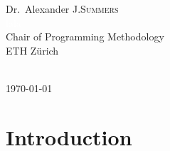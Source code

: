 \documentclass[titlepage,11pt,a4paper]{report}
\theoremstyle{plain}
\newcommand\blankpage{%
    \null
    \thispagestyle{empty}%
    \addtocounter{page}{-1}%
    \newpage}
\begin{document}
\begin{titlepage}
\begin{minipage}{0.4\textwidth}
\begin{flushright}
\large
Dr.~Alexander J.\textsc{Summers}\\ %
\textcolor{white}{lala}\\
Chair of Programming Methodology\\
ETH Zürich
\end{flushright}
\end{minipage}\\[2cm]



{\large \today}\\[2cm] %


 

\vfill %

\afterpage{\blankpage}

\end{titlepage}




\tableofcontents

\afterpage{\blankpage}


\chapter{Introduction}

\end{document}
